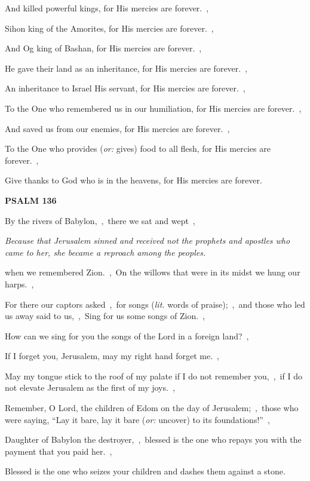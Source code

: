 \documentclass[12pt,twoside,a5paper]{article}
\newcommand{\psalm}[1]{\textbf{PSALM {#1}}\nopagebreak}
\newcommand{\qanona}[1]{{\liturgicalhint{Qanona.} \emph{#1}}}
\newcommand{\translationoption}[1]{\emph{or:} #1}
\newcommand{\translationliteral}[1]{\emph{lit.} #1}
\begin{document}
\begin{normalparskip}
  And killed powerful kings, for His mercies are forever.~\sep

  Sihon king of the Amorites, for His mercies are forever.~\sep

  And Og king of Bashan, for His mercies are forever.~\sep

  He gave their land as an inheritance, for His mercies are forever.~\sep

  An inheritance to Israel His servant, for His mercies are forever.~\sep

  To the One who remembered us in our humiliation, for His mercies are forever.~\sep

  And saved us from our enemies, for His mercies are forever.~\sep

  To the One who provides (\translationoption{gives}) food to all flesh, for His mercies are forever.~\sep

  Give thanks to God who is in the heavens, for His mercies are forever.
\end{normalparskip}

\psalm{136}

\begin{normalparskip}
  By the rivers of Babylon,~\sep\ there we sat and wept~\sep

  \qanona{Because that Jerusalem sinned and received not the prophets and apostles who came to her, she became a reproach among the peoples.}

  when we remembered Zion.~\sep\ On the willows that were in its midst we hung our harps.~\sep

  For there our captors asked~\sep\ for songs (\translationliteral{words of praise});~\sep\ and those who led us away said to us,~\sep\ Sing for us some songs of Zion.~\sep

  How can we sing for you the songs of the Lord in a foreign land?~\sep

  If I forget you, Jerusalem, may my right hand forget me.~\sep

  May my tongue stick to the roof of my palate if I do not remember you,~\sep\ if I do not elevate Jerusalem as the first of my joys.~\sep

  Remember, O Lord, the children of Edom on the day of Jerusalem;~\sep\ those who were saying, ``Lay it bare, lay it bare (\translationoption{uncover}) to its foundations!''~\sep

  Daughter of Babylon the destroyer,~\sep\ blessed is the one who repays you with the payment that you paid her.~\sep

  Blessed is the one who seizes your children and dashes them against a stone.
\end{normalparskip}
\end{document}
